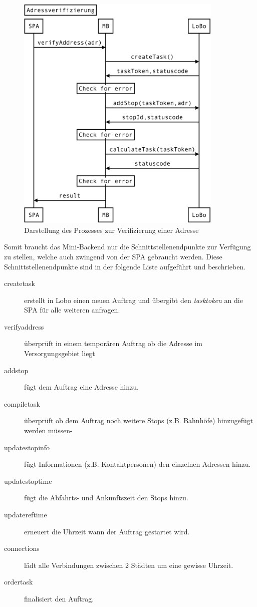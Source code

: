 \begin{figure}[ht]
	\centering
  \includegraphics[width=0.88\textwidth]{images/addressverify.png}
	\caption{Darstellung des Prozesses zur Verifizierung einer Adresse}
	\label{fig:addressverify}
\end{figure}

Somit braucht das Mini-Backend nur die Schnittstellenendpunkte zur Verfügung zu stellen, welche auch zwingend von der SPA gebraucht werden. Diese Schnittstellenendpunkte sind in der folgende Liste aufgeführt und beschrieben.

\begin{description}
	\item[createtask] erstellt in Lobo einen neuen Auftrag und übergibt den \textit{tasktoken} an die SPA für alle weiteren anfragen.
	\item[verifyaddress] überprüft in einem temporären Auftrag ob die Adresse im Versorgungsgebiet liegt
	\item[addstop] fügt dem Auftrag eine Adresse hinzu.
	\item[compiletask] überprüft ob dem Auftrag noch weitere Stops (z.B. Bahnhöfe) hinzugefügt werden müssen-
	\item[updatestopinfo] fügt Informationen (z.B. Kontaktpersonen) den einzelnen Adressen hinzu.
	\item[updatestoptime] fügt die Abfahrts- und Ankunftszeit den Stops hinzu.
	\item[updatereftime] erneuert die Uhrzeit wann der Auftrag gestartet wird.
	\item[connections] lädt alle Verbindungen zwischen 2 Städten um eine gewisse Uhrzeit.
	\item[ordertask] finalisiert den Auftrag.
\end{description}

